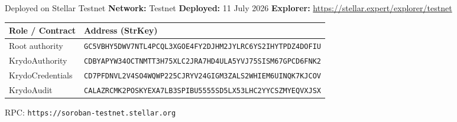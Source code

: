 \documentclass[aspectratio=169,11pt]{beamer}
\newcommand{\mono}[1]{\texttt{\small #1}}
\begin{document}
\begin{frame}[fragile]{Deployed on Stellar Testnet}
  \small
  \textbf{Network:} Testnet \quad
  \textbf{Deployed:} 11 July 2026 \quad
  \textbf{Explorer:} \url{https://stellar.expert/explorer/testnet}
  \vspace{0.5em}

  \begin{table}
    \renewcommand{\arraystretch}{1.4}
    \begin{tabularx}{\textwidth}{@{}l >{\raggedright\arraybackslash}X@{}}
      \toprule
      \textbf{Role / Contract} & \textbf{Address (StrKey)} \\
      \midrule
      Root authority & \mono{GC5VBHY5DWV7NTL4PCQL3XGOE4FY2DJHM2JYLRC6YS2IHYTPDZ4DOFIU} \\
      KrydoAuthority & \mono{CDBYAPYW34OCTNMTT3H75XLC2JRA7HD4ULA5YVJ75SISM67GPCD6FNK2} \\
      KrydoCredentials & \mono{CD7PFDNVL2V4SO4WQWP225CJRYV24GIGM3ZALS2WHIEM6UINQK7KJCOV} \\
      KrydoAudit & \mono{CALAZRCMK2POSKYEXA7LB3SPIBU5555SD5LX53LHC2YYCSZMYEQVXJSX} \\
      \bottomrule
    \end{tabularx}
  \end{table}
  \vspace{0.2em}
  \footnotesize
  RPC: \mono{https://soroban-testnet.stellar.org}
\end{frame}
\end{document}
